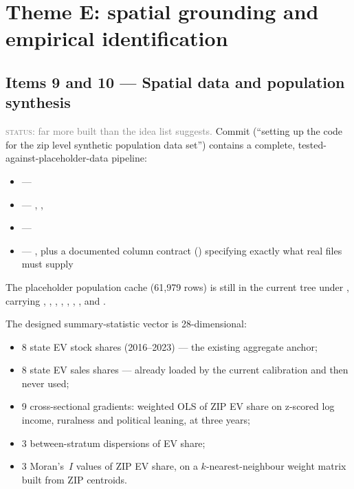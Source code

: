 \documentclass[11pt]{article}
\newcommand{\status}[1]{\textcolor{gray}{\textsc{status:} #1}}
\begin{document}
\section{Theme E: spatial grounding and empirical identification}

\subsection{Items 9 and 10 --- Spatial data and population synthesis}
\label{sec:spatial}

\status{far more built than the idea list suggests.} Commit 
(``setting up the code for the zip level synthetic population data set'')
contains a complete, tested-against-placeholder-data pipeline:

\begin{itemize}[leftmargin=1.5em, itemsep=0pt]
\item {} --- 
\item {} --- ,
  ,
\item {} --- 
\item {} --- ,
  plus a documented column contract ()
  specifying exactly what real files must supply
\end{itemize}

\noindent
The placeholder population cache (61{,}979 rows) is still in the current
tree under , carrying
, , , , ,
, ,  and
.

The designed summary-statistic vector is 28-dimensional:
\begin{itemize}[leftmargin=1.5em]
\item 8 state EV stock shares (2016--2023) --- the existing aggregate
  anchor;
\item 8 state EV sales shares --- already loaded by the current calibration
  and then never used;
\item 9 cross-sectional gradients: weighted OLS of ZIP EV share on
  z-scored log income, ruralness and political leaning, at three years;
\item 3 between-stratum dispersions of EV share;
\item 3 Moran's~$I$ values of ZIP EV share, on a $k$-nearest-neighbour
  weight matrix built from ZIP centroids.
\end{itemize}
\end{document}

